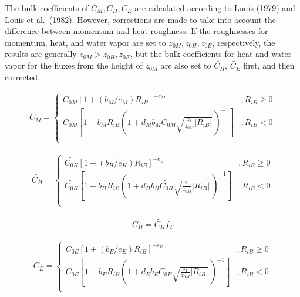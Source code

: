 The bulk coefficients of \(C_M,C_H,C_E\) are calculated according to
Louis (1979) and Louis et al.~(1982). However, corrections are made to
take into account the difference between momentum and heat roughness. If
the roughnesses for momentum, heat, and water vapor are set to
\(z_{0M}, z_{0H}, z_{0E}\), respectively, the results are generally
\(z_{0M} > z_{0H}, z_{0E}\), but the bulk coefficients for heat and
water vapor for the fluxes from the height of \(z_{0M}\) are also set to
\(\widetilde{C_H}\), \(\widetilde{C_E}\) first, and then corrected.

\begin{eqnarray}
C_M = \left\{
      \begin{array}{lr}
      C_{0M} [ 1 + (b_M/e_M)  R_{iB} ]^{-e_M}
            &,
          R_{iB} \geq 0 \\
      C_{0M} \left[ 1 - b_M R_{iB} \left( 1+ d_M b_M C_{0M}
                                  \sqrt{\frac{z_1}{z_{0M}}| R_{iB}|} \,
                                  \right)^{-1} \right]
          &,
          R_{iB} < 0 \\
      \end{array} \right.
\end{eqnarray}

\begin{eqnarray}
\widetilde{C_H} = \left\{
      \begin{array}{lr}
      \widetilde{C_{0H}} [ 1 + (b_H/e_H) R_{iB} ]^{-e_H}
            &,
          R_{iB} \geq 0 \\
      \widetilde{C_{0H}} \left[ 1 - b_H R_{iB}
                                  \left( 1+ d_H b_H \widetilde{C_{0H}}
                                  \sqrt{\frac{z_1}{z_{0M}}| R_{iB}|} \,
                                  \right)^{-1} \right]
             &,
          R_{iB} < 0 \\
      \end{array} \right.
\end{eqnarray}

\begin{eqnarray}
C_H = \widetilde{C_H} f_T
\end{eqnarray}

\begin{eqnarray}
\widetilde{C_E} = \left\{
      \begin{array}{lr}
      \widetilde{C_{0E}} [ 1 + (b_E/e_E) R_{iB} ]^{-e_E}
            &,
          R_{iB} \geq 0 \\
      \widetilde{C_{0E}} \left[ 1 - b_E R_{iB}
                                  \left( 1+ d_E b_E \widetilde{C_{0E}}
                                  \sqrt{\frac{z_1}{z_{0M}}| R_{iB}|} \,
                                  \right)^{-1} \right]
          &,
          R_{iB} < 0 \\
      \end{array} \right.
\end{eqnarray}

